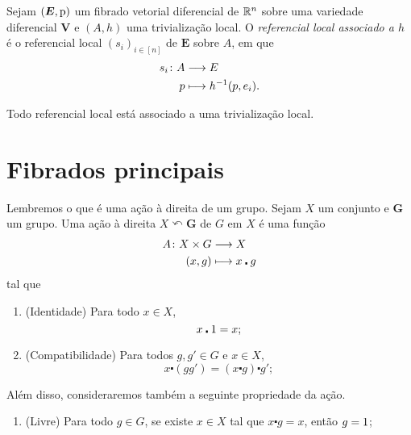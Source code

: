 \begin{definition}
Sejam $(\bm E,\mathrm{p})$ um fibrado vetorial diferencial de $\mathbb{R}^n$ sobre uma variedade diferencial $\bm V$ e $(A,h)$ uma trivialização local. O \emph{referencial local associado a $h$} é o referencial local $(s_i)_{i \in [n]}$ de $\bm E$ sobre $A$, em que
	\begin{align*}
	{s_i}\colon {A} &\longrightarrow {E} \\{p} &\longmapsto h^{-1} (p,e_i).
	\end{align*}
\end{definition}

\begin{exercise}
Todo referencial local está associado a uma trivialização local.
\end{exercise}






\section{Fibrados principais}

Lembremos o que é uma ação à direita de um grupo. Sejam $X$ um conjunto e $\bm G$ um grupo. Uma ação à direita $X \curvearrowleft \bm G$ de $G$ em $X$ é uma função
	\begin{align*}
	{A}\colon {X \times G} &\longrightarrow {X} \\{(x,g)} &\longmapsto x \centerdot g
	\end{align*}
tal que
	\begin{enumerate}
	\item (Identidade) Para todo $x \in X$,
		\begin{equation*}
		x \centerdot 1 = x;
		\end{equation*}

	\item (Compatibilidade) Para todos $g,g' \in G$ e $x \in X$,
		\begin{equation*}
		x \centerdot (gg') = (x \centerdot g) \centerdot g';
		\end{equation*}
	\end{enumerate}

Além disso, consideraremos também a seguinte propriedade da ação.
	\begin{enumerate}
%	
	\item (Livre) Para todo $g \in G$, se existe $x \in X$ tal que $x \centerdot g = x$, então $g=1$;
%	
	\end{enumerate}
%

